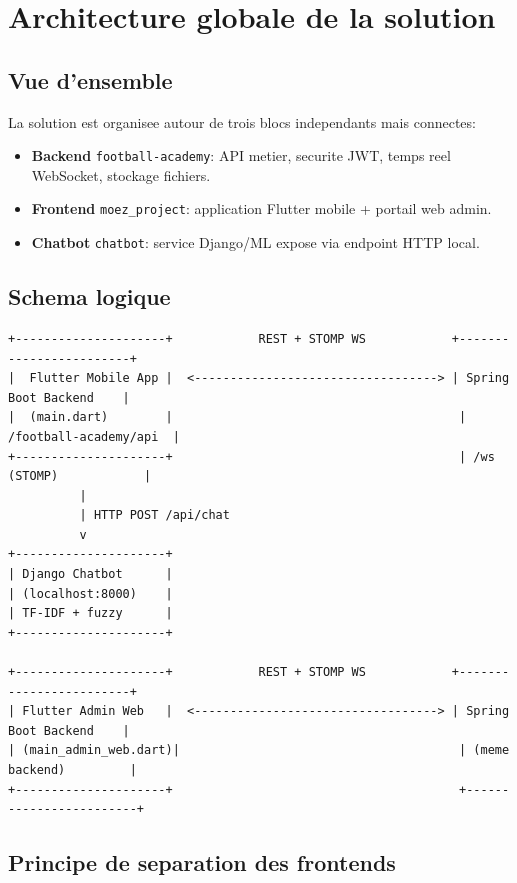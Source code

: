 \chapter{Architecture globale de la solution}

\section{Vue d'ensemble}

La solution est organisee autour de trois blocs independants mais connectes:
\begin{itemize}[leftmargin=*]
  \item \textbf{Backend} \texttt{football-academy}: API metier, securite JWT, temps reel WebSocket, stockage fichiers.
  \item \textbf{Frontend} \texttt{moez\_project}: application Flutter mobile + portail web admin.
  \item \textbf{Chatbot} \texttt{chatbot}: service Django/ML expose via endpoint HTTP local.
\end{itemize}

\section{Schema logique}

\begin{lstlisting}[style=codeblock]
+---------------------+            REST + STOMP WS            +------------------------+
|  Flutter Mobile App |  <----------------------------------> | Spring Boot Backend    |
|  (main.dart)        |                                        | /football-academy/api  |
+---------------------+                                        | /ws (STOMP)            |
          |
          | HTTP POST /api/chat
          v
+---------------------+
| Django Chatbot      |
| (localhost:8000)    |
| TF-IDF + fuzzy      |
+---------------------+

+---------------------+            REST + STOMP WS            +------------------------+
| Flutter Admin Web   |  <----------------------------------> | Spring Boot Backend    |
| (main_admin_web.dart)|                                       | (meme backend)         |
+---------------------+                                        +------------------------+
\end{lstlisting}

\section{Principe de separation des frontends}


